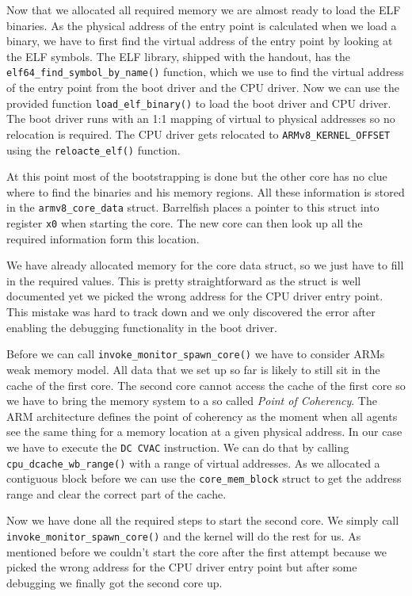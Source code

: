 Now that we allocated all required memory we are almost ready to load the ELF binaries. As the physical
address of the entry point is calculated when we load a binary, we have to first find the virtual address
of the entry point by looking at the ELF symbols. The ELF library, shipped with the handout, has the
\verb|elf64_find_symbol_by_name()| function, which we use to find the virtual address of the entry point
from the boot driver and the CPU driver. Now we can use the provided function \verb|load_elf_binary()| to
load the boot driver and CPU driver. The boot driver runs with an 1:1 mapping of virtual to physical
addresses so no relocation is required. The CPU driver gets relocated to \verb|ARMv8_KERNEL_OFFSET| using
the \verb|reloacte_elf()| function.

At this point most of the bootstrapping is done but the other core has no clue where to find the binaries
and his memory regions. All these information is stored in the \verb|armv8_core_data| struct. Barrelfish
places a pointer to this struct into register \verb|x0| when starting the core. The new core can then look
up all the required information form this location.

We have already allocated memory for the core data struct, so we just have to fill in the required values.
This is pretty straightforward as the struct is well documented yet we picked the wrong address for the
CPU driver entry point. This mistake was hard to track down and we only discovered the error after enabling
the debugging functionality in the boot driver.

Before we can call \verb|invoke_monitor_spawn_core()| we have to consider ARMs weak memory model. All data
that we set up so far is likely to still sit in the cache of the first core. The second core cannot access
the cache of the first core so we have to bring the memory system to a so called \textit{Point of Coherency}.
The ARM architecture defines the point of coherency as the moment when all agents see the same thing for a
memory location at a given physical address. In our case we have to execute the \verb|DC CVAC| instruction.
We can do that by calling \verb|cpu_dcache_wb_range()| with a range of virtual addresses. As we allocated a
contiguous block before we can use the \verb|core_mem_block| struct to get the address range and clear the
correct part of the cache.

Now we have done all the required steps to start the second core. We simply call \verb|invoke_monitor_spawn_core()|
and the kernel will do the rest for us. As mentioned before we couldn't start the core after the first attempt
because we picked the wrong address for the CPU driver entry point but after some debugging we finally got the
second core up.

